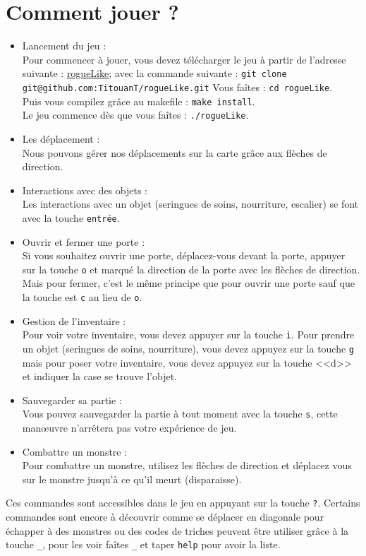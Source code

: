 \documentclass[11pt]{report}
\begin{document}
	\section{Comment jouer ?}
		\begin{itemize}
			\item{Lancement du jeu : \\}
				Pour commencer à jouer, vous devez télécharger le jeu à partir de l'adresse suivante : \href{https://github.com/TitouanT/rogueLike/} {rogueLike}; avec la commande suivante : \texttt{git clone git@github.com:TitouanT/rogueLike.git}
				Vous faîtes : \texttt{cd rogueLike}. \\
				Puis vous compilez grâce au makefile : \texttt{make install}. \\
				Le jeu commence dès que vous faîtes : \texttt{./rogueLike}.	
			\item{Les déplacement : \\}
				Nous pouvons gérer nos déplacements sur la carte grâce aux flèches de direction. 
			\item{Interactions avec des objets : \\}	
				Les interactions avec un objet (seringues de soins, nourriture, escalier) se font avec la touche \texttt{entrée}.
			\item{Ouvrir et fermer une porte :\\}	
				Si vous souhaitez ouvrir une porte, déplacez-vous devant la porte, appuyer sur la touche \texttt{o} et marqué la direction de la porte avec les flèches de direction.
				Mais pour fermer, c'est le même principe que pour ouvrir une porte sauf que la touche est \texttt{c} au lieu de \texttt{o}.
			\item{Gestion de l'inventaire : \\}
				Pour voir votre inventaire, vous devez appuyer sur la touche \texttt{i}. Pour prendre un objet (seringues de soins, nourriture), vous devez appuyez sur la touche \texttt{g} mais pour poser votre inventaire, vous devez appuyez sur la touche <<d>> et indiquer la case se trouve l'objet.
			\item{Sauvegarder sa partie :\\}
				Vous pouvez sauvegarder la partie à tout moment avec la touche \texttt{s}, cette manœuvre n'arrêtera pas votre expérience de jeu.
			\item{Combattre un monstre :\\}
				Pour combattre un monstre, utilisez les flèches de direction et déplacez vous sur le monstre jusqu'à ce qu'il meurt (disparaisse).		
		\end{itemize}
		Ces commandes sont accessibles dans le jeu en appuyant sur la touche \texttt{?}.
		Certains commandes sont encore à découvrir comme se déplacer en diagonale pour échapper à des monstres ou des codes de triches peuvent être utiliser grâce à la touche \texttt{\_}, pour les voir faîtes \texttt{\_} et taper \texttt{help} pour avoir la liste.
		
\end{document}
